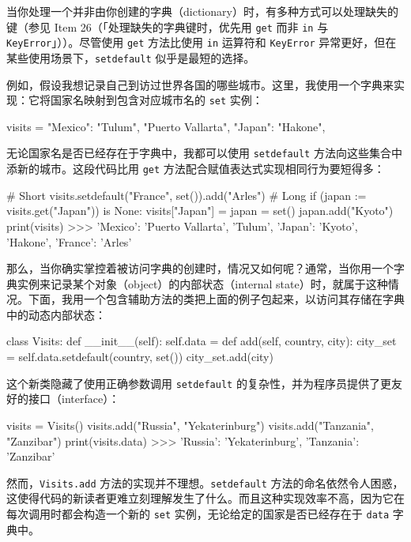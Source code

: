 当你处理一个并非由你创建的字典（dictionary）时，有多种方式可以处理缺失的键（参见 Item 26（「处理缺失的字典键时，优先用 \texttt{get} 而非 \texttt{in} 与 \texttt{KeyError}」））。尽管使用 \texttt{get} 方法比使用 \texttt{in} 运算符和 \texttt{KeyError} 异常更好，但在某些使用场景下，\texttt{setdefault} 似乎是最短的选择。

例如，假设我想记录自己到访过世界各国的哪些城市。这里，我使用一个字典来实现：它将国家名映射到包含对应城市名的 \texttt{set} 实例：

\begin{codebox}[python]
visits = {
    "Mexico": {"Tulum", "Puerto Vallarta"},
    "Japan": {"Hakone"},
}
\end{codebox}

无论国家名是否已经存在于字典中，我都可以使用 \texttt{setdefault} 方法向这些集合中添新的城市。这段代码比用 \texttt{get} 方法配合赋值表达式实现相同行为要短得多：

\begin{codebox}[python]
# Short
visits.setdefault("France", set()).add("Arles")
# Long
if (japan := visits.get("Japan")) is None:
    visits["Japan"] = japan = set()
japan.add("Kyoto")
print(visits)
>>>
{'Mexico': {'Puerto Vallarta', 'Tulum'},
 'Japan': {'Kyoto', 'Hakone'},
 'France': {'Arles'}}
\end{codebox}

那么，当你确实掌控着被访问字典的创建时，情况又如何呢？通常，当你用一个字典实例来记录某个对象（object）的内部状态（internal state）时，就属于这种情况。下面，我用一个包含辅助方法的类把上面的例子包起来，以访问其存储在字典中的动态内部状态：

\begin{codebox}[python]
class Visits:
    def __init__(self):
        self.data = {}
    def add(self, country, city):
        city_set = self.data.setdefault(country, set())
        city_set.add(city)
\end{codebox}

这个新类隐藏了使用正确参数调用 \texttt{setdefault} 的复杂性，并为程序员提供了更友好的接口（interface）：

\begin{codebox}[python]
visits = Visits()
visits.add("Russia", "Yekaterinburg")
visits.add("Tanzania", "Zanzibar")
print(visits.data)
>>>
{'Russia': {'Yekaterinburg'}, 'Tanzania': {'Zanzibar'}}
\end{codebox}

然而，\texttt{Visits.add} 方法的实现并不理想。\texttt{setdefault} 方法的命名依然令人困惑，这使得代码的新读者更难立刻理解发生了什么。而且这种实现效率不高，因为它在每次调用时都会构造一个新的 \texttt{set} 实例，无论给定的国家是否已经存在于 \texttt{data} 字典中。

